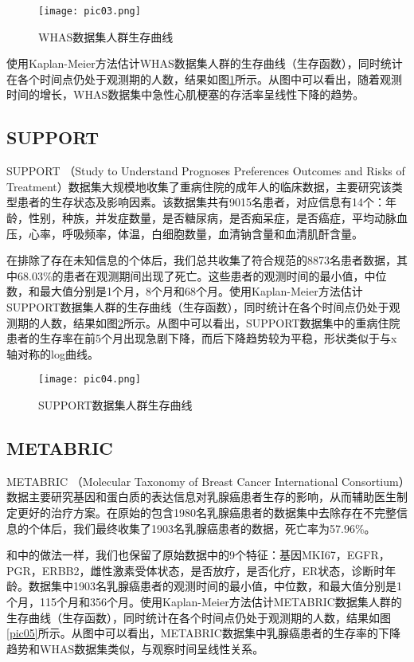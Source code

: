 \begin{figure}[H]
\texttt{[image: pic03.png]}
\caption{WHAS数据集人群生存曲线}
\label{pic03}
\end{figure}

使用Kaplan-Meier方法估计WHAS数据集人群的生存曲线（生存函数），同时统计在各个时间点仍处于观测期的人数，结果如图\ref{pic03}所示。从图中可以看出，随着观测时间的增长，WHAS数据集中急性心肌梗塞的存活率呈线性下降的趋势。

\subsection{SUPPORT}

SUPPORT （Study to Understand Prognoses Preferences Outcomes and Risks of Treatment）数据集大规模地收集了重病住院的成年人的临床数据，主要研究该类型患者的生存状态及影响因素。该数据集共有9015名患者，对应信息有14个：年龄，性别，种族，并发症数量，是否糖尿病，是否痴呆症，是否癌症，平均动脉血压，心率，呼吸频率，体温，白细胞数量，血清钠含量和血清肌酐含量。

在排除了存在未知信息的个体后，我们总共收集了符合规范的8873名患者数据，其中68.03\%的患者在观测期间出现了死亡。这些患者的观测时间的最小值，中位数，和最大值分别是1个月，8个月和68个月。使用Kaplan-Meier方法估计SUPPORT数据集人群的生存曲线（生存函数），同时统计在各个时间点仍处于观测期的人数，结果如图\ref{pic04}所示。从图中可以看出，SUPPORT数据集中的重病住院患者的生存率在前5个月出现急剧下降，而后下降趋势较为平稳，形状类似于与x轴对称的log曲线。

\begin{figure}[H]
\texttt{[image: pic04.png]}
\caption{SUPPORT数据集人群生存曲线}
\label{pic04}
\end{figure}

\subsection{METABRIC}

METABRIC （Molecular Taxonomy of Breast Cancer International Consortium）数据主要研究基因和蛋白质的表达信息对乳腺癌患者生存的影响，从而辅助医生制定更好的治疗方案。在原始的包含1980名乳腺癌患者的数据集中去除存在不完整信息的个体后，我们最终收集了1903名乳腺癌患者的数据，死亡率为57.96\%。

和\cite{Katzman2018DeepSurv}中的做法一样，我们也保留了原始数据中的9个特征：基因MKI67，EGFR，PGR，ERBB2，雌性激素受体状态，是否放疗，是否化疗，ER状态，诊断时年龄。数据集中1903名乳腺癌患者的观测时间的最小值，中位数，和最大值分别是1个月，115个月和356个月。使用Kaplan-Meier方法估计METABRIC数据集人群的生存曲线（生存函数），同时统计在各个时间点仍处于观测期的人数，结果如图\ref{pic05}所示。从图中可以看出，METABRIC数据集中乳腺癌患者的生存率的下降趋势和WHAS数据集类似，与观察时间呈线性关系。

